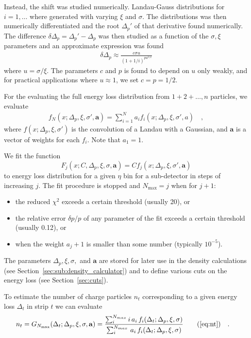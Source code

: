 \documentclass[compat,11pt]{alicenote}
\newcommand{\secref}[1]{Section~\ref{#1}}
\begin{document}
Instead, the shift was studied numerically. Landau-Gauss
distributions for $i=1,\ldots$ where generated with varying
$\xi$ and $\sigma$.  The distributions was then numerically
differentiated and the root $\Delta_p'$ of that derivative
found numerically.  The difference
$\delta\Delta_p=\Delta_p'-\Delta_p$ was then studied as a
function of the $\sigma,\xi$ parameters and an approximate
expression was found
\begin{align}
  \delta\Delta_p \approx \frac{c \sigma u}{(1+1/i)^{p u^{3/2}}}
\end{align}
where $ u=\sigma/\xi$.  The parameters $c$ and $p$ is
found to depend on $ u$ only weakly, and for practical
applications where $u\approx1$, we set $ c=p=1/2$. 

For the evaluating the full energy loss distribution from
$1+2+\ldots,n$ particles, we evaluate
\begin{align}
  f_N(x;\Delta_p,\xi,\sigma',\mathbf{a})=\sum_{i=1}^N a_i
  f_i(x;\Delta_p,\xi,\sigma',a)\quad,
\end{align}
where $ f(x;\Delta_p,\xi,\sigma')$ is the convolution of a Landau with
a Gaussian, and $\mathbf{a}$ is a vector of weights for each $
f_i$. Note that $a_1 = 1$.

We fit the function 
$$
F_j(x;C,\Delta_p,\xi,\sigma,\mathbf{a}) = C
f_j(x;\Delta_p,\xi,\sigma',\mathbf{a})
$$
to energy loss distribution for a given $\eta$ bin for a sub-detector
in steps of increasing $j$.  The fit procedure is stopped and
$N_{\text{max}}=j$ when for
$j+1$: 
\begin{itemize}
\item the reduced $\chi^2$ exceeds a certain threshold (usually 20), or
\item the relative error $\delta p/p$ of any parameter of the fit
  exceeds a certain threshold (usually 0.12), or 
\item when the weight $a_j+1$ is smaller than some number (typically
  $10^{-5}$). 
\end{itemize}
The parameters $\Delta_p,\xi,\sigma,$ and $\mathbf{a}$ are stored for
later use in the density calculations (see
\secref{sec:sub:density_calculator}) and to define various cuts on
the energy loss (see \secref{sec:cuts}). 

To estimate the number of charge particles $n_t$ corresponding to a given
energy loss $\Delta_t$ in strip $t$ we can evaluate 
\begin{align}
  n_t &= G_{N_{\text{max}}}(\Delta_t;\Delta_p,\xi,\sigma,\mathbf{a}) =
  \frac{\sum_i^{N_{max}} i\,a_i\,f_i(\Delta_t;\Delta_p,\xi,\sigma)}{
    \sum_i^{N_{max}}\,a_i\,f_i(\Delta_t;\Delta_p,\xi,\sigma)}
  \tag{\ref{eq:nt}}\quad. 
\end{align}
\end{document}
